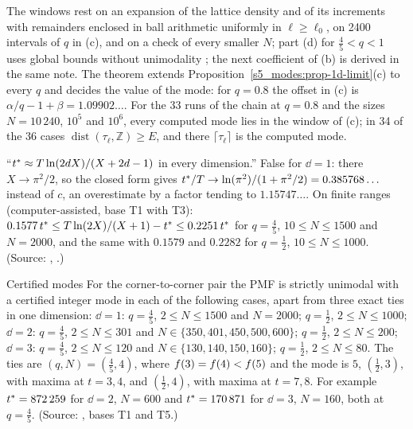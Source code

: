 The windows rest on an expansion of the lattice density and of its increments with remainders enclosed in ball
arithmetic uniformly in $\ell\ge\ell_0$, on 2400 intervals of $q$ in (c), and on a check of every smaller $N$; part (d)
for $\frac45<q<1$ uses global bounds without unimodality ; the next coefficient of (b) is derived in the same note. The theorem extends Proposition~\ref{s5_modes:prop-1d-limit}(c)
to every $q$ and decides the value of the mode: for $q=0.8$ the offset in (c) is $\alpha/q-1+\beta=1.09902\ldots$. For
the 33 runs of the chain at $q=0.8$ and the sizes $N=10\,240$, $10^{5}$ and $10^{6}$, every computed mode lies in the
window of (c); in 34 of the 36 cases $\operatorname{dist}(\tau_\ell,\mathbb Z)\ge E$, and there $\lceil\tau_\ell\rceil$ is the
computed mode.

\begin{refuted}\label{s6b_rigorous:ref-cf1d}
``$t^{*}\approx T\ln(2d X)/(X+2d-1)$ in every dimension.'' False for $\dd=1$: there $X\to\pi^{2}/2$, so the
closed form gives $t^{*}/T\to\ln(\pi^{2})/(1+\pi^{2}/2)=0.385768\ldots$ instead of $c$, an overestimate by a
factor tending to $1.15747\ldots$. On finite ranges (computer-assisted, base T1 with T3):
$0.1577\,t^{*}\le T\ln(2X)/(X+1)-t^{*}\le0.2251\,t^{*}$ for $q=\frac45$, $10\le N\le1500$ and $N=2000$, and the
same with $0.1579$ and $0.2282$ for $q=\frac12$, $10\le N\le1000$.
\textup{(Source: , .)}
\end{refuted}

\begin{catheorem}{Certified modes}\label{s6b_rigorous:thm-certified}
For the corner-to-corner pair the PMF is strictly unimodal with a certified integer mode in each of the following
cases, apart from three exact ties in one dimension: $\dd=1$: $q=\frac45$, $2\le N\le1500$ and $N=2000$; $q=\frac12$,
$2\le N\le1000$; $\dd=2$: $q=\frac45$, $2\le N\le301$ and $N\in\{350,401,450,500,600\}$; $q=\frac12$, $2\le N\le200$;
$\dd=3$: $q=\frac45$, $2\le N\le120$ and $N\in\{130,140,150,160\}$; $q=\frac12$, $2\le N\le80$.
The ties are $(q,N)=(\frac45,4)$, where $f(3)=f(4)<f(5)$ and the mode is $5$, $(\frac12,3)$, with maxima at
$t=3,4$, and $(\frac12,4)$, with maxima at $t=7,8$. For example $t^{*}=872\,259$ for $\dd=2$, $N=600$ and
$t^{*}=170\,871$ for $\dd=3$, $N=160$, both at $q=\frac45$.
\textup{(Source: , bases T1 and T5.)}
\end{catheorem}

